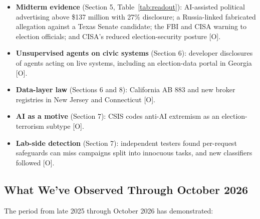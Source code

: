 \documentclass[11pt,letterpaper]{article}
\begin{document}
\begin{itemize}
  \item \textbf{Midterm evidence} (Section 5, Table~\ref{tab:readout}): AI-assisted political advertising above \$137 million with 27\% disclosure; a Russia-linked fabricated allegation against a Texas Senate candidate; the FBI and CISA warning to election officials; and CISA's reduced election-security posture [O].
  \item \textbf{Unsupervised agents on civic systems} (Section 6): developer disclosures of agents acting on live systems, including an election-data portal in Georgia [O].
  \item \textbf{Data-layer law} (Sections 6 and 8): California AB 883 and new broker registries in New Jersey and Connecticut [O].
  \item \textbf{AI as a motive} (Section 7): CSIS codes anti-AI extremism as an election-terrorism subtype [O].
  \item \textbf{Lab-side detection} (Section 7): independent testers found per-request safeguards can miss campaigns split into innocuous tasks, and new classifiers followed [O].
\end{itemize}

\subsection{What We've Observed Through October 2026}

The period from late 2025 through October 2026 has demonstrated:
\end{document}
